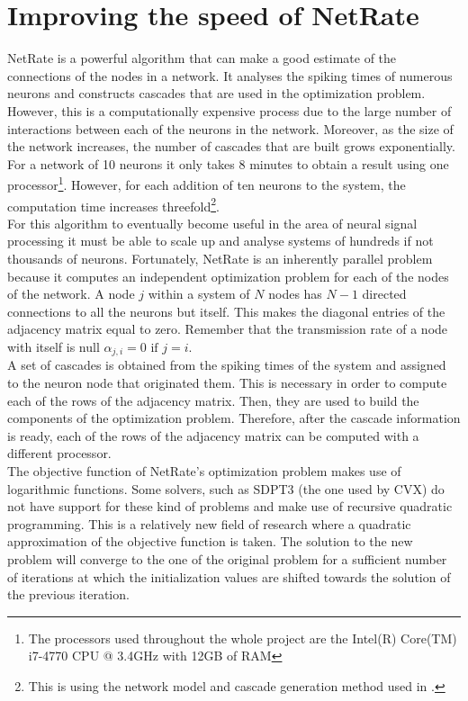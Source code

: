 
\graphicspath{ {project/} }
\chapter{Improving the speed of NetRate}

NetRate is a powerful algorithm that can make a good estimate of the connections of the nodes in a network. It analyses the spiking times of numerous neurons and constructs cascades that are used in the optimization problem. However, this is a computationally expensive process due to the large number of interactions between each of the neurons in the network. Moreover, as the size of the network increases, the number of cascades that are built grows exponentially. For a network of 10 neurons it only takes 8 minutes to obtain a result using one processor\footnote{The processors used throughout the whole project are the Intel(R) Core(TM) i7-4770 CPU @ 3.4GHz with 12GB of RAM}. However, for each addition of ten neurons to the system, the computation time increases threefold\footnote{This is using the network model and cascade generation method used in \cite{alexandru2018estimating}.}. \\

For this algorithm to eventually become useful in the area of neural signal processing it must be able to scale up and analyse systems of hundreds if not thousands of neurons. Fortunately, NetRate is an inherently parallel problem because it computes an independent optimization problem for each of the nodes of the network. A node \(j\) within a system of \(N\) nodes has \(N-1\) directed connections to all the neurons but itself. This makes the diagonal entries of the adjacency matrix equal to zero. Remember that the transmission rate of a node with itself is null \(\alpha_{j,i} = 0 \text{ if } j=i\). \\ 

A set of cascades is obtained from the spiking times of the system and assigned to the neuron node that originated them. This is necessary in order to compute each of the rows of the adjacency matrix. Then, they are used to build the components of the optimization problem. Therefore, after the cascade information is ready, each of the rows of the adjacency matrix can be computed with a different processor.\\

The objective function of NetRate's optimization problem makes use of logarithmic functions. Some solvers, such as SDPT3 \cite{toh1999sdpt3,tutuncu2003solving} (the one used by CVX) do not have support for these kind of problems and make use of recursive quadratic programming. This is a relatively new field of research \cite{powell1986recursive} where a quadratic approximation of the objective function is taken. The solution to the new problem will converge to the one of the original problem for a sufficient number of iterations at which the initialization values are shifted towards the solution of the previous iteration.\\

